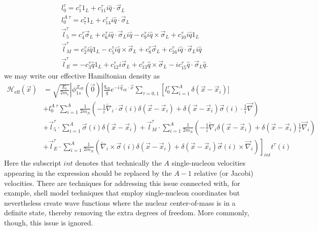 \documentclass{book}[letterpaper,12pt]
\begin{document}
\begin{equation}
\begin{split}
&l_0^{\tau}=c_1^{\tau}1_L+c_{11}^{\tau}i\hat{q}\cdot\vec{\sigma}_L\\
&l_0^{A\;\tau}=c_7^{\tau}1_L+c_{14}^{\tau}i\hat{q}\cdot\vec{\sigma}_L\\
&\vec{l}_5^{\tau}=c_4^{\tau}\vec{\sigma}_L+c_6^{\tau}i\hat{q}\cdot\vec{\sigma}_Li\hat{q}-c_9^{\tau}i\hat{q}\times\vec{\sigma}_L+c_{10}^{\tau}i\hat{q}1_L\\
&\vec{l}_M^{\tau}=c_2^{\tau}i\hat{q}1_L-c_5^{\tau}i\hat{q}\times\vec{\sigma}_L+c_8^{\tau}\vec{\sigma}_L+c_{16}^{\tau}i\hat{q}\cdot\vec{\sigma}_Li\hat{q}\\
&\vec{l}_E^{\tau}=-c_3^{\tau}\hat{q}1_L+c_{12}^{\tau}i\vec{\sigma}_L+c_{13}^{\tau}\hat{q}\times\vec{\sigma}_L-ic_{15}^{\tau}\hat{q}\cdot\vec{\sigma}_L\hat{q}.
\end{split}
\end{equation}
we may write our effective Hamiltonian density as
\begin{equation}
\begin{split}
\mathcal{H}_\mathrm{eff}(\vec{x})&=\sqrt{\frac{E_e}{2m_e}}|\phi_{1s}^{Z_\mathrm{eff}}(\vec{0})|\frac{q_\mathrm{eff}}{q}e^{-i\vec{q}_\mathrm{eff}\cdot\vec{x}}\sum_{\tau=0,1}\left[l_0^{\tau}\sum_{i=1}^A\delta(\vec{x}-\vec{x}_i)]\right.\\
&\left.+l_0^{A\;\tau}\sum_{i=1}^A\frac{1}{2m_N}\left(-\frac{1}{i}\overleftarrow{\nabla}_i\cdot\vec{\sigma}(i)\delta(\vec{x}-\vec{x}_i)+\delta(\vec{x}-\vec{x}_i)\vec{\sigma}(i)\cdot\frac{1}{i}\overrightarrow{\nabla}\right)\right.\\
&+\vec{l}_5^{\tau}\cdot\sum_{i=1}^A\vec{\sigma}(i)\delta(\vec{x}-\vec{x}_i)+\vec{l}_M^{\tau}\cdot\sum_{i=1}^A\frac{1}{2m_N}\left(-\frac{1}{i}\overleftarrow{\nabla}_i\delta(\vec{x}-\vec{x}_i)+\delta(\vec{x}-\vec{x}_i)\frac{1}{i}\overrightarrow{\nabla}_i\right)\\
&\left.+\vec{l}_E^{\tau}\cdot\sum_{i=1}^A\frac{1}{2m_N}\left(\overleftarrow{\nabla}_i\times\vec{\sigma}(i)\delta(\vec{x}-\vec{x}_i)+\delta(\vec{x}-\vec{x}_i)\vec{\sigma}(i)\times\overrightarrow{\nabla}_i\right)\right]_{int} t^{\tau}(i)
\end{split}
\label{eq:H_NRET}
\end{equation}
Here the subscript $int$ denotes that technically the $A$ single-nucleon velocities appearing in the expression should be replaced by the $A-1$ relative (or Jacobi) velocities. There are techniques for addressing this issue connected with, for example, shell model techniques that employ single-nucleon coordinates but nevertheless create wave functions where the nuclear center-of-mass is in a definite state, thereby removing the extra degrees of freedom. More commonly, though, this issue is ignored.
\end{document}
